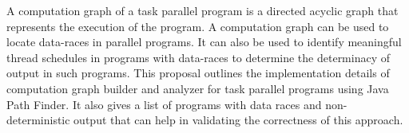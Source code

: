 A computation graph of a task parallel program is a directed acyclic graph that represents the execution of the program. A computation graph can be used to locate data-races in parallel programs. It can also be used to identify meaningful thread schedules in programs with data-races to determine the determinacy of output in such programs. This proposal outlines the implementation details of computation graph builder and analyzer for task parallel programs using Java Path Finder. It also gives a list of programs with data races and non-deterministic output that can help in validating the correctness of this approach.